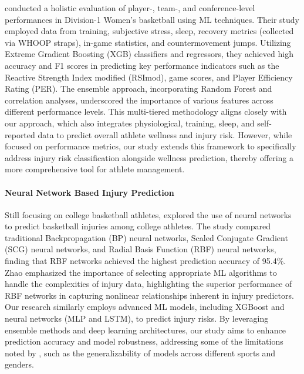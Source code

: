 \documentclass[manuscript,acmsmall,review,screen,authorversion=true]{acmart}
\begin{document}
\citet{taber2024} conducted a holistic evaluation of player-, team-, and conference-level performances in Division-1 Women’s basketball using ML techniques. Their study employed data from training, subjective stress, sleep, recovery metrics (collected via WHOOP straps), in-game statistics, and countermovement jumps. Utilizing Extreme Gradient Boosting (XGB) classifiers and regressors, they achieved high accuracy and F1 scores in predicting key performance indicators such as the Reactive Strength Index modified (RSImod), game scores, and Player Efficiency Rating (PER). The ensemble approach, incorporating Random Forest and correlation analyses, underscored the importance of various features across different performance levels. This multi-tiered methodology aligns closely with our approach, which also integrates physiological, training, sleep, and self-reported data to predict overall athlete wellness and injury risk. However, while \citet{taber2024} focused on performance metrics, our study extends this framework to specifically address injury risk classification alongside wellness prediction, thereby offering a more comprehensive tool for athlete management.
\paragraph{Neural Network Based Injury Prediction}
Still focusing on college basketball athletes, \citet{zhao2022} explored the use of neural networks to predict basketball injuries among college athletes. The study compared traditional Backpropagation (BP) neural networks, Scaled Conjugate Gradient (SCG) neural networks, and Radial Basis Function (RBF) neural networks, finding that RBF networks achieved the highest prediction accuracy of 95.4\%. Zhao emphasized the importance of selecting appropriate ML algorithms to handle the complexities of injury data, highlighting the superior performance of RBF networks in capturing nonlinear relationships inherent in injury predictors. Our research similarly employs advanced ML models, including XGBoost and neural networks (MLP and LSTM), to predict injury risks. By leveraging ensemble methods and deep learning architectures, our study aims to enhance prediction accuracy and model robustness, addressing some of the limitations noted by \citet{zhao2022}, such as the generalizability of models across different sports and genders.
\end{document}
